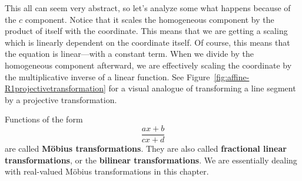 This all can seem very abstract, so let's analyze some what happens 
because of the \(c\) component. Notice that it scales the homogeneous 
component by the product of itself with the coordinate. This means that 
we are getting a scaling which is linearly dependent on the coordinate itself.
Of course, this means that the equation is linear---with a constant term.
When we divide by the homogeneous component afterward, we are 
effectively scaling the coordinate by the multiplicative inverse of a 
linear function. See Figure~\ref{fig:affine-R1projectivetransformation} 
for a visual analogue of transforming a line segment by a projective transformation.
\begin{remark}
    Functions of the form \[\frac{ax+b}{cx+d}\] are called 
    \textbf{Möbius transformations}. They are also called 
    \textbf{fractional linear transformations}, or the 
    \textbf{bilinear transformations}. We are essentially dealing 
    with real-valued Möbius transformations in this chapter.
\end{remark}

